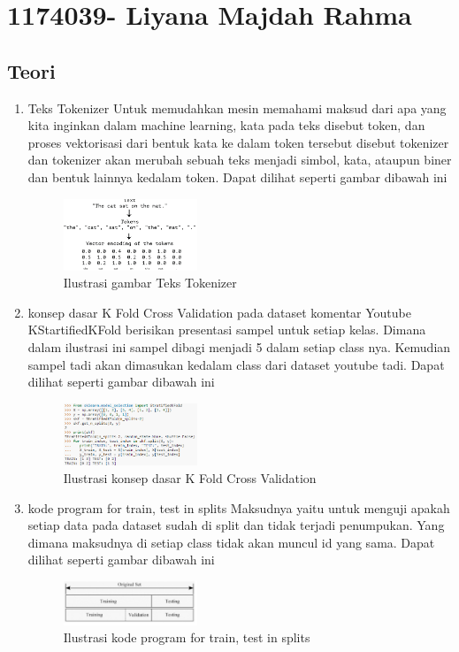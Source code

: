 \section{1174039- Liyana Majdah Rahma}
    \subsection{Teori}
    \begin{enumerate}
        \item {Teks Tokenizer}
        \subitem Untuk memudahkan mesin memahami maksud dari apa yang kita inginkan dalam machine learning, kata pada teks disebut token, dan proses vektorisasi dari bentuk kata ke dalam token tersebut disebut tokenizer dan tokenizer akan merubah sebuah teks menjadi simbol, kata, ataupun biner dan bentuk lainnya kedalam token. Dapat dilihat seperti gambar dibawah ini
        \begin{figure}[H]
            \includegraphics[width=4cm]{figures/1174039/chapter7/1.png}
            \centering
            \caption{Ilustrasi gambar Teks Tokenizer}
        \end{figure}
        
        \item {konsep dasar K Fold Cross Validation pada dataset komentar Youtube} 
        \subitem KStartifiedKFold berisikan presentasi sampel untuk setiap kelas. Dimana dalam ilustrasi ini sampel dibagi menjadi 5 dalam setiap class nya. Kemudian sampel tadi akan dimasukan kedalam class dari dataset youtube tadi. Dapat dilihat seperti gambar dibawah ini
        \begin{figure}[H]
            \includegraphics[width=4cm]{figures/1174039/chapter7/2.png}
            \centering
            \caption{Ilustrasi konsep dasar K Fold Cross Validation}
        \end{figure}
        
        \item {kode program for train, test in splits} 
        \subitem Maksudnya yaitu untuk menguji apakah setiap data pada dataset sudah di split dan tidak terjadi penumpukan. Yang dimana maksudnya di setiap class tidak akan muncul id yang sama.  Dapat dilihat seperti gambar dibawah ini
        \begin{figure}[H]
            \includegraphics[width=4cm]{figures/1174039/chapter7/3.jpeg}
            \centering
            \caption{Ilustrasi kode program for train, test in splits}
        \end{figure}
        

\end{enumerate}
